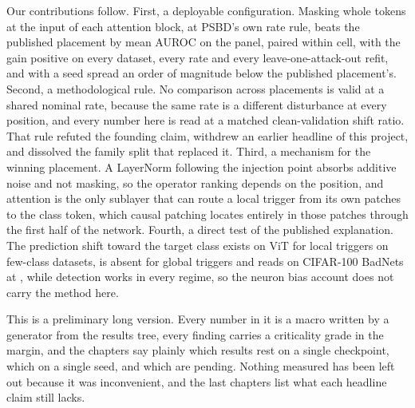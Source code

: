 \documentclass[../main.tex]{subfiles}
\begin{document}
Our contributions follow. First, a deployable configuration. Masking whole tokens at the input of each attention block, at PSBD's own rate rule, beats the published placement by \HeadlineGainAdaptiveAuroc{} mean AUROC on the panel, paired within cell, with the gain positive on every dataset, every rate and every leave-one-attack-out refit, and with a seed spread an order of magnitude below the published placement's. Second, a methodological rule. No comparison across placements is valid at a shared nominal rate, because the same rate is a different disturbance at every position, and every number here is read at a matched clean-validation shift ratio. That rule refuted the founding claim, withdrew an earlier headline of this project, and dissolved the family split that replaced it. Third, a mechanism for the winning placement. A LayerNorm following the injection point absorbs additive noise and not masking, so the operator ranking depends on the position, and attention is the only sublayer that can route a local trigger from its own patches to the class token, which causal patching locates entirely in those patches through the first half of the network. Fourth, a direct test of the published explanation. The prediction shift toward the target class exists on ViT for local triggers on few-class datasets, is absent for global triggers and reads \ShiftToTargetHeadlineCell{} on CIFAR-100 BadNets at \PanelRateLow{}, while detection works in every regime, so the neuron bias account does not carry the method here.

This is a preliminary long version. Every number in it is a macro written by a generator from the results tree, every finding carries a criticality grade in the margin, and the chapters say plainly which results rest on a single checkpoint, which on a single seed, and which are pending. Nothing measured has been left out because it was inconvenient, and the last chapters list what each headline claim still lacks.
\end{document}
